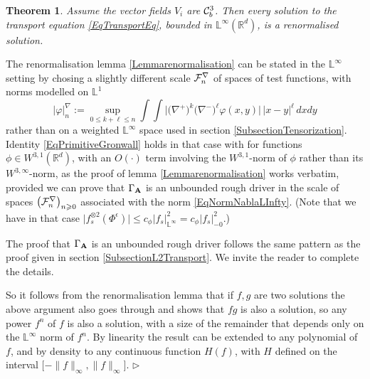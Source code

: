 \documentclass[11pt,a4paper]{amsart}
\newcommand{\RR}{\mathbb{R}}  \newcommand{\CC}{\mathbb{C}}  \newcommand{\LL}{\mathbb{L}}  \newcommand{\WW}{\mathbb{W}}
\renewcommand{\leq}{\leqslant}
\renewcommand{\geq}{\geqslant}
\newcommand{\ssk}{\smallskip}
\newtheorem{thm}{\hspace{-0.15cm}  {\sc Theorem} } %
\numberwithin{equation}{section} %
\newenvironment{Dem}{%
    \begin{list}{\hspace{0.5cm}{\sc Proof --}}{%
        \setlength{\topsep}{0pt}%
        \setlength{\leftmargin}{0pt}%
        \setlength{\rightmargin}{0pt}%
        \setlength{\listparindent}{0pt}%
        \setlength{\itemindent}{0pt}%
        \setlength{\parsep}{0pt}%
        \addtolength{\leftmargin}{20pt}%
        \addtolength{\rightmargin}{0pt}%
    } \item }{\hfill{\space $\rhd$}\end{list}\smallskip}
\begin{document}
\begin{thm}
\label{ThmRenomalizedSolutions}
Assume the vector fields $V_i$ are $\mathcal{C}^3_b$. Then every solution to the transport equation \eqref{EqTransportEq}, bounded in $ \LL^\infty(\RR^d)$, is a renormalised solution.
\end{thm}
 
\medskip
 
\begin{Dem}  
The renormalisation lemma \ref{Lemmarenormalisation} can be stated in the $\LL^\infty$ setting by chosing a slightly different scale $\mathcal{F}^\nabla_n$ of spaces of test functions,  with norms modelled on $\LL^1$ 
\begin{equation}
\label{EqNormNablaLInfty} 
\big| \varphi \big|^\nabla_n := \sup_{0 \leqslant k + \ell \leqslant n} \int \int \Big|\big(\nabla^+\big)^k \big(\nabla^-\big)^\ell \varphi (x, y) \Big|\,|x-y|^\ell\,dx dy  
\end{equation}
rather than on a weighted $\LL^\infty$ space used in section \ref{SubsectionTensorization}. Identity \eqref{EqPrimitiveGronwall} holds in that case with for functions $\phi\in W^{3,1}(\RR^d)$, with an $O(\cdot)$ term involving the $W^{3,1}$-norm of $\phi$ rather than its $W^{3,\infty}$-norm, as the proof of lemma \ref{Lemmarenormalisation} works verbatim, provided we can prove that $\Gamma_{\bf A}$ is an unbounded rough driver in the scale of spaces $\big(\mcF_n^\nabla\big)_{n\geq 0}$ associated with the norm \eqref{EqNormNablaLInfty}.  (Note that we have in that case $\big| f_s^{\otimes 2}(\Phi^\epsilon)\big| \leq c_\phi \big| f_s\big|_{\LL^\infty}^2 = c_\phi \big| f_s\big|_{-0}^2$.)

\medskip

The proof that $\Gamma_{\bf A}$ is an unbounded rough driver follows the same pattern as the proof given in section \ref{SubsectionL2Transport}. We invite the reader to complete the details.

\ssk

So it follows from the renormalisation lemma that if $f, g$ are two solutions the above argument also goes through and shows that $fg$ is also a solution, so any power $f^n$ of $f$ is also a solution, with a size of the remainder that depends only on the $\LL^{\infty}$ norm of $f^n$. By linearity the result can be extended to any polynomial of $f$, and by density to any continuous function $H (f)$, with $H$ defined on the interval $\big[- \| f \|_{\infty}, \| f \|_{\infty}\big]$. 
\end{Dem}
 
\end{document}
